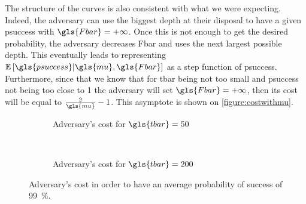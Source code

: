 The structure of the curves is also consistent with what we were expecting. Indeed, the adversary can use the biggest \gls{depth} at their disposal to have a given \gls{psuccess} with \(\gls{Fbar}=+\infty\). Once this is not enough to get the desired probability, the adversary decreases \gls{Fbar} and uses the next largest possible \gls{depth}. This eventually leads to representing \(\ES{\gls{psuccess}}{\gls{mu},\gls{Fbar}}\) as a step function of \gls{psuccess}. Furthermore, since that we know that for \gls{tbar} being not too small and \gls{psuccess} not being too close to 1 the adversary will set \(\gls{Fbar}=+\infty\), then its cost will be equal to \(\frac{2}{\gls{mu}}-1\). This asymptote is shown on \autoref{figure:costwithmu}.

\begin{figure}[ht]
    \centering
    \begin{subfigure}[b]{0.45\textwidth}
        \centering 
        \caption{Adversary's cost for \(\gls{tbar}=50\)}
        \label{figure:costwithmu144}
    \end{subfigure}
    ~
    \begin{subfigure}[b]{0.45\textwidth}
        \centering
        \caption{Adversary's cost for \(\gls{tbar}=200\)}
        \label{figure:costwithmu288}
    \end{subfigure}
    \caption{Adversary's cost in order to have an average probability of success of \SI{99}{\percent}.}
    \label{figure:costwithmu}
\end{figure}

